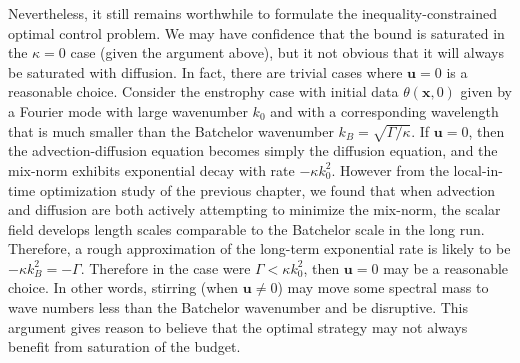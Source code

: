 Nevertheless, it still remains worthwhile to formulate the inequality-constrained optimal control problem. We may have confidence that the bound is saturated in the $\kappa =0$ case (given the argument above), but it not obvious that it will always be saturated with diffusion. In fact, there are trivial cases where $\mathbf{u} = 0$ is a reasonable choice. Consider the enstrophy case with initial data $\theta(\mathbf{x},0)$ given by a Fourier mode with large wavenumber $k_0$ and with a corresponding wavelength that is much smaller than the Batchelor wavenumber $k_{B} = \sqrt{\Gamma/\kappa}$. If $\mathbf{u} = 0$, then the advection-diffusion equation becomes simply the diffusion equation, and the mix-norm exhibits exponential decay with rate $-\kappa k_0^2$. However from the local-in-time optimization study of the previous chapter, we found that when advection and diffusion are both actively attempting to minimize the mix-norm, the scalar field develops length scales comparable to the Batchelor scale in the long run. Therefore, a rough approximation of the long-term exponential rate is likely to be $-\kappa k_{B}^2 = -\Gamma$. Therefore in the case were $\Gamma < \kappa k_0^2$, then $\mathbf{u} = 0$ may be a reasonable choice. In other words, stirring (when $\mathbf{u}\neq 0$) may move some spectral mass to wave numbers less than the Batchelor wavenumber and be disruptive. This argument gives reason to believe that the optimal strategy may not always benefit from saturation of the budget.


%
 
 

